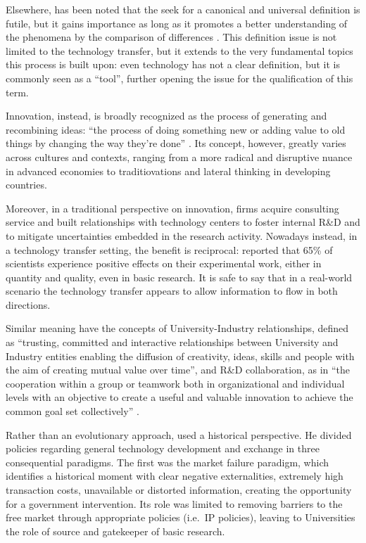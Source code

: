 Elsewhere, has been noted that the seek for a canonical and universal definition is futile, but it gains importance as long as it promotes a better understanding of the phenomena by the comparison of differences \citep{Bozeman2000}. This definition issue is not limited to the technology transfer, but it extends to the very fundamental topics this process is built upon: even technology has not a clear definition, but it is commonly seen as a \enquote{tool}, further opening the issue for the qualification of this term. 

Innovation, instead, is broadly recognized as the process of generating and recombining ideas: \enquote{the process of doing something new or adding value to old things by changing the way they're done} \citep{Baskaran2016}. Its concept, however, greatly varies across cultures and contexts, ranging from a more radical and disruptive nuance in advanced economies to traditiovations and lateral thinking in developing countries.

Moreover, in a traditional perspective on innovation, firms acquire consulting service and built relationships with technology centers to foster internal R\&D and to mitigate uncertainties embedded in the research activity. Nowadays instead, in a technology transfer setting, the benefit is reciprocal: \citet{Siegel2003a} reported that 65\% of scientists experience positive effects on their experimental work, either in quantity and quality, even in basic research. It is safe to say that in a real-world scenario the technology transfer appears to allow information to flow in both directions.

Similar meaning have the concepts of University-Industry relationships, defined as \enquote{trusting, committed and interactive relationships between University and Industry entities enabling the diffusion of creativity, ideas, skills and people with the aim of creating mutual value over time}, and R\&D collaboration, as in \enquote{the cooperation within a group or teamwork both in organizational and individual levels with an objective to create a useful and valuable innovation to achieve the common goal set collectively} \citep{Frasquet2012}. 

Rather than an evolutionary approach, \citet{Bozeman2000} used a historical perspective. He divided policies regarding general technology development and exchange in three consequential paradigms. The first was the market failure paradigm, which identifies a historical moment with clear negative externalities, extremely high transaction costs, unavailable or distorted information, creating the opportunity for a government intervention. Its role was limited to removing barriers to the free market through appropriate policies (i.e.\ IP policies), leaving to Universities the role of source and gatekeeper of basic research.

